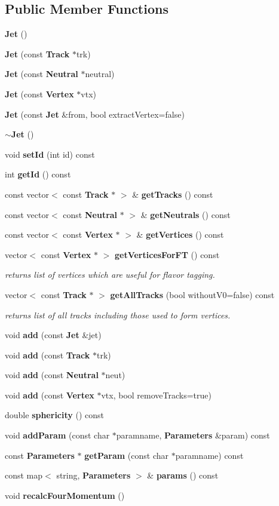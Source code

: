\subsection*{Public Member Functions}
\begin{DoxyCompactItemize}
\item 
{\bf Jet} ()
\item 
{\bf Jet} (const {\bf Track} $\ast$trk)
\item 
{\bf Jet} (const {\bf Neutral} $\ast$neutral)
\item 
{\bf Jet} (const {\bf Vertex} $\ast$vtx)
\item 
{\bf Jet} (const {\bf Jet} \&from, bool extract\-Vertex=false)
\item 
{\bf $\sim$\-Jet} ()
\item 
void {\bf set\-Id} (int id) const 
\item 
int {\bf get\-Id} () const 
\item 
const vector$<$ const {\bf Track} $\ast$ $>$ \& {\bf get\-Tracks} () const 
\item 
const vector$<$ const {\bf Neutral} $\ast$ $>$ \& {\bf get\-Neutrals} () const 
\item 
const vector$<$ const {\bf Vertex} $\ast$ $>$ \& {\bf get\-Vertices} () const 
\item 
vector$<$ const {\bf Vertex} $\ast$ $>$ {\bf get\-Vertices\-For\-F\-T} () const 
\begin{DoxyCompactList}\small\item\em returns list of vertices which are useful for flavor tagging. \end{DoxyCompactList}\item 
vector$<$ const {\bf Track} $\ast$ $>$ {\bf get\-All\-Tracks} (bool without\-V0=false) const 
\begin{DoxyCompactList}\small\item\em returns list of all tracks including those used to form vertices. \end{DoxyCompactList}\item 
void {\bf add} (const {\bf Jet} \&jet)
\item 
void {\bf add} (const {\bf Track} $\ast$trk)
\item 
void {\bf add} (const {\bf Neutral} $\ast$neut)
\item 
void {\bf add} (const {\bf Vertex} $\ast$vtx, bool remove\-Tracks=true)
\item 
double {\bf sphericity} () const 
\item 
void {\bf add\-Param} (const char $\ast$paramname, {\bf Parameters} \&param) const 
\item 
const {\bf Parameters} $\ast$ {\bf get\-Param} (const char $\ast$paramname) const 
\item 
const map$<$ string, {\bf Parameters} $>$ \& {\bf params} () const 
\item 
void {\bf recalc\-Four\-Momentum} ()
\end{DoxyCompactItemize}

